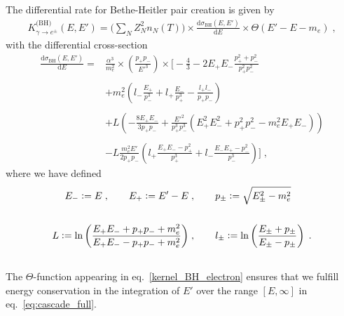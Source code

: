 \documentclass[11pt,a4paper]{article}
\newcommand{\eqsp}{\;}
\newcommand{\ldefine}{\vcentcolon=}
\begin{document}
The differential rate for Bethe-Heitler pair creation is given by~\cite{berestetskii1982quantum, Kawasaki:1994sc}
\begin{align}
K_{\gamma \rightarrow e^\pm}^\text{(BH)}(E, E') = \Bigg( \sum_N Z_N^2 n_N(T) \Bigg) \times \frac{\text{d}\sigma_\text{BH}(E, E')}{\text{d}E} \times \Theta(E' - E-m_e) \eqsp,
\label{kernel_BH_electron}
\end{align}
with the differential cross-section
\begin{align}
\frac{\text{d}\sigma_\text{BH}(E, E')}{\text{d}E} = & \frac{\alpha^3}{m_e^2} \times \left( \frac{p_+ p_-}{E'^3} \right) \times \Bigg[ -\frac43 - 2E_+E_- \frac{p_+^2 + p_-^2}{p_+^2 p_-^2} \nonumber \\ \nonumber \\
& + m_e^2 \left( l_-\frac{E_+}{p_-^3} + l_+\frac{E_-}{p_+^3} - \frac{l_+ l_-}{p_+ p_-} \right) \nonumber \\ \nonumber \\
& + L\left( -\frac{8E_+E_-}{3p_+p_-} + \frac{E'^2}{p_+^3 p_-^3} \left( E_+^2E_-^2 + p_+^2 p_-^2 - m_e^2E_+ E_- \right) \right) \nonumber \\ \nonumber \\
& - L\frac{m_e^2E'}{2p_+ p_-}\left( l_+\frac{E_+ E_- - p_+^2}{p_+^3} + l_-\frac{E_- E_+ - p_-^2}{p_-^3} \right) \Bigg] \eqsp,
\end{align}
where we have defined
\begin{align}
E_- \ldefine E\eqsp,\qquad E_+ \ldefine E' - E&\eqsp,\qquad p_\pm \ldefine \sqrt{E_\pm^2 - m_e^2} \\ \nonumber \\
L \ldefine \ln\left( \frac{E_+ E_- + p_+ p_- + m_e^2}{E_+ E_- - p_+ p_- + m_e^2} \right)&\eqsp, \qquad l_\pm \ldefine \ln\left( \frac{E_\pm + p_\pm}{E_\pm - p_\pm} \right) \eqsp. \\ \nonumber
\end{align}
The $\Theta$-function appearing in eq.~\eqref{kernel_BH_electron} ensures that we fulfill energy conservation in the integration of $E'$ over the range $[E, \infty]$ in eq.~\eqref{eq:cascade_full}.
\end{document}
